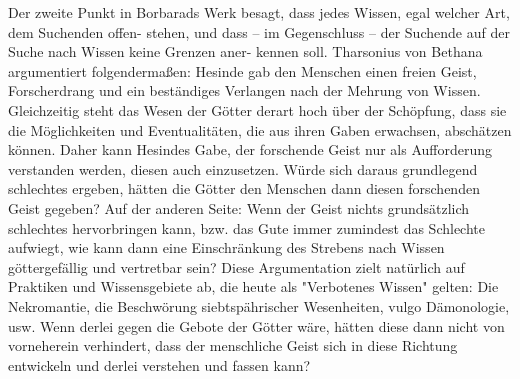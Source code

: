 \documentclass[11pt]{article}
\begin{document}
Der zweite Punkt in Borbarads Werk besagt, dass jedes Wissen, egal welcher Art, dem Suchenden offen-
stehen, und dass – im Gegenschluss – der Suchende auf der Suche nach Wissen keine Grenzen aner-
kennen soll. Tharsonius von Bethana argumentiert folgendermaßen: Hesinde gab den Menschen einen
freien Geist, Forscherdrang und ein beständiges Verlangen nach der Mehrung von Wissen. Gleichzeitig
steht das Wesen der Götter derart hoch über der Schöpfung, dass sie die Möglichkeiten und Eventualitäten, die aus ihren Gaben erwachsen, abschätzen können. Daher kann Hesindes Gabe, der forschende
Geist nur als Aufforderung verstanden werden, diesen auch einzusetzen. Würde sich daraus grundlegend
schlechtes ergeben, hätten die Götter den Menschen dann diesen forschenden Geist gegeben? Auf der
anderen Seite: Wenn der Geist nichts grundsätzlich schlechtes hervorbringen kann, bzw. das Gute immer zumindest das Schlechte aufwiegt, wie kann dann eine Einschränkung des Strebens nach Wissen
göttergefällig und vertretbar sein? Diese Argumentation zielt natürlich auf Praktiken und Wissensgebiete
ab, die heute als "Verbotenes Wissen" gelten: Die Nekromantie, die Beschwörung siebtspährischer Wesenheiten, vulgo Dämonologie, usw. Wenn derlei gegen die Gebote der Götter wäre, hätten diese dann
nicht von vorneherein verhindert, dass der menschliche Geist sich in diese Richtung entwickeln und
derlei verstehen und fassen kann?
\end{document}
